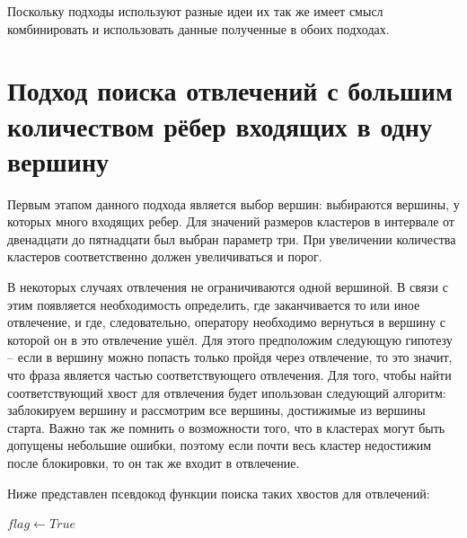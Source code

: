 \documentclass[times,specification,annotation]{itmo-student-thesis}
\begin{document}
	Поскольку подходы используют разные идеи их так же имеет смысл комбинировать и использовать данные полученные в обоих подходах.
	
	\label{algorithms}
	\section{Подход поиска отвлечений с большим количеством рёбер входящих в одну вершину}
	Первым этапом данного подхода является выбор вершин: выбираются вершины, у которых много входящих ребер. Для значений размеров кластеров в интервале от двенадцати до пятнадцати был выбран параметр три. При увеличении количества кластеров соответственно должен увеличиваться и порог.
	
	В некоторых случаях отвлечения не ограничиваются одной вершиной. В связи с этим появляется необходимость определить, где заканчивается то или иное отвлечение, и где, следовательно, оператору необходимо вернуться в вершину с которой он в это отвлечение ушёл. Для этого предположим следующую гипотезу -- если в вершину можно попасть только пройдя через отвлечение, то это значит, что фраза является частью соответствующего отвлечения. 
	Для того, чтобы найти соответствующий хвост для отвлечения будет ипользован следующий алгоритм: заблокируем вершину и рассмотрим все вершины, достижимые из вершины старта. Важно так же помнить о возможности того, что в кластерах могут быть допущены небольшие ошибки, поэтому если почти весь кластер недостижим после блокировки, то он так же входит в отвлечение.
	
	Ниже представлен псевдокод функции поиска таких хвостов для отвлечений:
	
	\begin{algorithmic}
		\State $flag\gets True$
		\Else
		\EndIf
		\EndFor
		\EndFor
		\Else
		\EndIf
		\EndIf
		\EndFor
		\State {}
		\EndFunction
	\end{algorithmic}	
	
\end{document}
